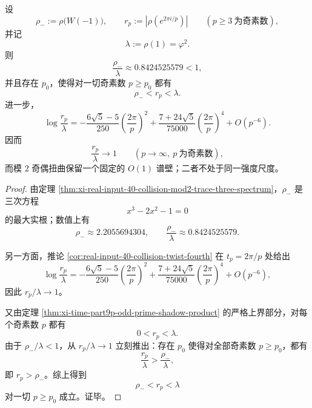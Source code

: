 \begin{corollary}\label{cor:xi-time-part62dg-parity-vs-large-prime-twist-separation}
设
\[
\rho_-:=\rho\!\bigl(W(-1)\bigr),
\qquad
r_p:=\left|\rho\!\left(e^{2\pi i/p}\right)\right|
\qquad (p\ge 3\ \text{为奇素数}),
\]
并记
\[
\lambda:=\rho(1)=\varphi^2.
\]
则
\[
\frac{\rho_-}{\lambda}\approx 0.8424525579<1,
\]
并且存在 \(p_0\)，使得对一切奇素数 \(p\ge p_0\) 都有
\[
\rho_-<r_p<\lambda.
\]
进一步，
\[
\log\frac{r_p}{\lambda}
=
-\frac{6\sqrt5-5}{250}\left(\frac{2\pi}{p}\right)^2
+\frac{7+24\sqrt5}{75000}\left(\frac{2\pi}{p}\right)^4
+O(p^{-6}).
\]
因而
\[
\frac{r_p}{\lambda}\to 1
\qquad (p\to\infty,\ p\ \text{为奇素数}),
\]
而模 \(2\) 奇偶扭曲保留一个固定的 \(O(1)\) 谱壁；二者不处于同一强度尺度。
\end{corollary}
\begin{proof}
由定理 \ref{thm:xi-real-input-40-collision-mod2-trace-three-spectrum}，\(\rho_-\) 是三次方程
\[
x^3-2x^2-1=0
\]
的最大实根；数值上有
\[
\rho_-\approx 2.2055694304,
\qquad
\frac{\rho_-}{\lambda}\approx 0.8424525579.
\]

另一方面，推论 \ref{cor:real-input-40-collision-twist-fourth} 在 \(t_p=2\pi/p\) 处给出
\[
\log\frac{r_p}{\lambda}
=
-\frac{6\sqrt5-5}{250}\left(\frac{2\pi}{p}\right)^2
+\frac{7+24\sqrt5}{75000}\left(\frac{2\pi}{p}\right)^4
+O(p^{-6}),
\]
因此 \(r_p/\lambda\to 1\)。

又由定理 \ref{thm:xi-time-part9p-odd-prime-shadow-product} 的严格上界部分，对每个奇素数 \(p\) 都有
\[
0<r_p<\lambda.
\]
由于 \(\rho_-/\lambda<1\)，从 \(r_p/\lambda\to 1\) 立刻推出：存在 \(p_0\) 使得对全部奇素数 \(p\ge p_0\)，都有
\[
\frac{r_p}{\lambda}>\frac{\rho_-}{\lambda},
\]
即 \(r_p>\rho_-\)。综上得到
\[
\rho_-<r_p<\lambda
\]
对一切 \(p\ge p_0\) 成立。证毕。
\end{proof}

